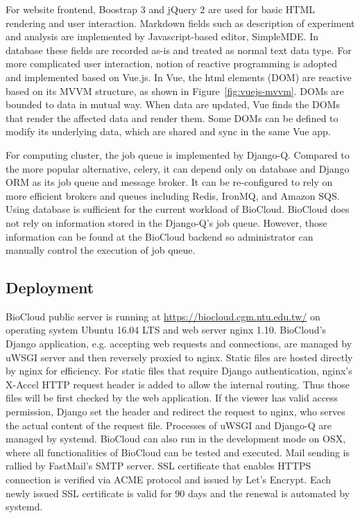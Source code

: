 For website frontend, Boostrap 3 and jQuery 2 are used for basic HTML
rendering and user interaction. Markdown fields such as description of
experiment and analysis are implemented by Javascript-based editor, SimpleMDE.
In database these fields are recorded as-is and treated as normal text
data type. For more complicated user interaction, notion of reactive
programming is adopted and implemented based on Vue.js. In Vue, the html
elements (DOM) are reactive based on its MVVM structure, as shown in
Figure~\ref{fig:vuejs-mvvm}. DOMs are bounded to data in mutual way. When data
are updated, Vue finds the DOMs that render the affected data and render
them. Some DOMs can be defined to modify its underlying data, which are shared
and sync in the same Vue app.



For computing cluster, the job queue is implemented by Django-Q. Compared to
the more popular alternative, celery, it can depend only on database and Django
ORM as its job queue and message broker. It can be re-configured to rely on
more efficient brokers and queues including Redis, IronMQ, and Amazon SQS.
Using database is sufficient for the current workload of BioCloud. BioCloud
does not rely on information stored in the Django-Q's job queue. However, those
information can be found at the BioCloud backend so administrator can manually
control the execution of job queue.


\subsection{Deployment}


BioCloud public server is running at \url{https://biocloud.cgm.ntu.edu.tw/} on
operating system Ubuntu 16.04 LTS and web server nginx 1.10. BioCloud's Django
application, e.g. accepting web requests and connections, are managed by uWSGI
server and then reversely proxied to nginx. Static files are hosted directly by
nginx for efficiency. For static files that require Django authentication,
nginx's X-Accel HTTP request header is added to allow the internal routing.
Thus those files will be first checked by the web application. If the viewer
has valid access permission, Django set the header and redirect the request to
nginx, who serves the actual content of the request file. Processes of uWSGI
and Django-Q are managed by systemd. BioCloud can also run in the development
mode on OSX, where all functionalities of BioCloud can be tested and executed.
Mail sending is rallied by FastMail's SMTP server. SSL certificate that enables
HTTPS connection is verified via ACME protocol and issued by Let's Encrypt.
Each newly issued SSL certificate is valid for 90 days and the renewal is
automated by systemd.


